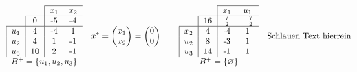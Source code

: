 \documentclass[a4paper,10pt]{article}
\begin{document}
\begin{compactenum} [(a)]
\[\begin{tabular}{cccc}
		\cline{3-4}
		& \multicolumn{1}{c|}{}    & \multicolumn{1}{c}{$x_1$} & \multicolumn{1}{c}{$x_2$} \\ \cline{2-4}
		\multicolumn{1}{c|}{}    & \multicolumn{1}{c|}{0} & \multicolumn{1}{c}{-5}   & \multicolumn{1}{c}{-4} \\ \hline
		\multicolumn{1}{|c|}{$u_1$} & \multicolumn{1}{c|}{4} & -4 & 1\\
		\multicolumn{1}{|c|}{$u_2$} & \multicolumn{1}{c|}{4} & 1 & -1\\
		\multicolumn{1}{|c|}{$u_3$} & \multicolumn{1}{c|}{10} & 2 & -1\\
		\multicolumn{4}{c}{$B^+ = \{u_1, u_2, u_3\}$} %
		\end{tabular}
		\quad
		x^* = 
		\begin{pmatrix}
		x_1\\
		x_2
		\end{pmatrix}
		=
		\begin{pmatrix}
		0\\
		0
		\end{pmatrix}
		\quad
		\quad
		\begin{tabular}{cccc}
		\cline{3-4}
		& \multicolumn{1}{c|}{}    & \multicolumn{1}{l}{$x_1$} & \multicolumn{1}{c}{$u_1$} \\ \cline{2-4} 
		\multicolumn{1}{c|}{}    & \multicolumn{1}{c|}{16} & \multicolumn{1}{c}{$\frac{7}{2}$} & \multicolumn{1}{c}{$-\frac{7}{2}$} \\ \hline 
		\multicolumn{1}{|c|}{$x_2$} & \multicolumn{1}{c|}{4} & -4 & 1 \\
		\multicolumn{1}{|c|}{$u_2$} & \multicolumn{1}{c|}{8} & -3 & 1 \\
		\multicolumn{1}{|c|}{$u_3$} & \multicolumn{1}{c|}{14} & -1 & 1\\
		\multicolumn{4}{c}{$B^+ = \{\varnothing\}$} %
		\end{tabular}
		\setlength{\extrarowheight}{0pt}
		\quad
		\text{Schlauen Text hierrein}
		\]
	\end{compactenum} 
\end{document}
